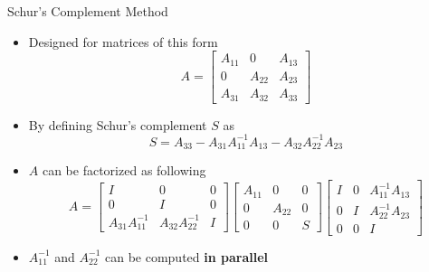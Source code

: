 \documentclass[final]{beamer}
\newlength{\onecolwid}
\begin{document}
\begin{frame}[t]
\begin{columns}[t]
\begin{column}{\onecolwid}
        \begin{block}{Schur's Complement Method}
          \begin{itemize}
            \item Designed for matrices of this form
              \begin{equation*}
                A = \left[
                \begin{array}{ccc}
                  A_{11} &      0 & A_{13} \\
                       0 & A_{22} & A_{23} \\
                  A_{31} & A_{32} & A_{33}
                \end{array}
                \right]
              \end{equation*}
            \item By defining Schur’s complement $S$ as
              \begin{equation*}
                S = A_{33} - A_{31}A^{-1}_{11}A_{13} - A_{32}A^{-1}_{22}A_{23}
              \end{equation*}
            \item $A$ can be factorized as following
              \small
              \begin{equation*}
                A=
                \left[
                \begin{array}{ccc}
                                  I &                 0 & 0 \\
                                  0 &                 I & 0 \\
                  A_{31}A^{-1}_{11} & A_{32}A^{-1}_{22} & I
                \end{array}
                \right]
                \left[
                  \begin{array}{ccc}
                    A_{11} &      0 & 0 \\
                         0 & A_{22} & 0 \\
                         0 &      0 & S
                  \end{array}
                \right]
                \left[
                \begin{array}{ccc}
                  I & 0 & A^{-1}_{11}A_{13} \\
                  0 & I & A^{-1}_{22}A_{23} \\
                  0 & 0 &                 I
                \end{array}
                \right]
              \end{equation*}
              \normalsize
            \item $A^{-1}_{11}$ and $A^{-1}_{22}$ can be computed \textbf{in parallel}
          \end{itemize}
        \end{block}
      \end{column}


\end{columns}
\end{frame}
\end{document}
